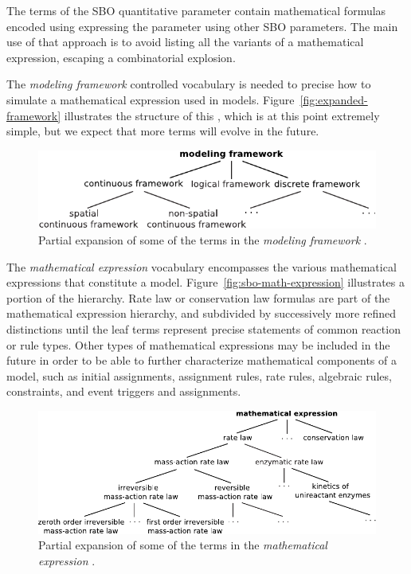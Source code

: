 The terms of the SBO quantitative parameter  contain
mathematical formulas encoded using \mathmltwo
expressing the parameter using other SBO parameters.  The
main use of that approach is to avoid listing all the variants of a
mathematical expression, escaping a combinatorial explosion.

The \emph{modeling framework} controlled vocabulary is needed to
precise how to simulate a mathematical expression used in models.  Figure~\vref{fig:expanded-framework}
illustrates the structure of this , which is at this point
extremely simple, but we expect that more terms will evolve in the
future.

\begin{figure}[tbh]
  \vspace*{1ex}
  \centering
  \includegraphics[scale = 0.8]{figs/sbo-framework}
  \caption{Partial expansion of some of the terms in the
    \emph{modeling framework} .}
  \label{fig:expanded-framework}
\end{figure}

\begin{blockChanged}

The \emph{mathematical expression} vocabulary encompasses the
various mathematical expressions that constitute a model.
Figure~\vref{fig:sbo-math-expression} illustrates a portion of the
hierarchy.  Rate law or conservation law formulas are part of the mathematical
expression hierarchy, and subdivided by successively more refined
distinctions until the leaf terms represent precise statements of
common reaction or rule types.  Other types of mathematical expressions
may be included in the future in order to be
able to further characterize mathematical components of a model, such as initial assignments, assignment rules, rate rules,
algebraic rules, constraints, and event triggers and assignments.

\end{blockChanged}

\begin{figure}[tbh]
  \centering
  \includegraphics[scale = 0.8]{figs/sbo-math-expression}
  \caption{Partial expansion of some of the terms in the \emph{mathematical
      expression} .}
  \label{fig:sbo-math-expression}
\end{figure}

